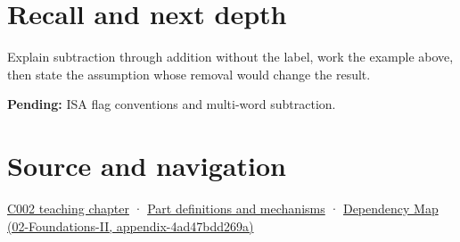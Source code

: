 \section{Recall and next depth}\label{appendix-1c7df340573e-recall-and-next-depth}

Explain subtraction through addition without the label, work the example above, then state the assumption whose removal would change the result.

\textbf{Pending:} ISA flag conventions and multi-word subtraction.

\section{Source and navigation}\label{appendix-1c7df340573e-source-and-navigation}

\href{Continuous\%20Notes/Computing\%20Foundations\%20-\%20From\%20Bits\%20to\%20C++\%20and\%20Systems\%20APIs\#Arithmetic\%20becomes\%20a\%20policy}{C002 teaching chapter} · \hyperref[appendix-fd090d982a15]{Part definitions and mechanisms} · \href{../02-Foundations-II/main.pdf\#nameddest=appendix-4ad47bdd269a}{Dependency Map (02-Foundations-II, appendix-4ad47bdd269a)}

